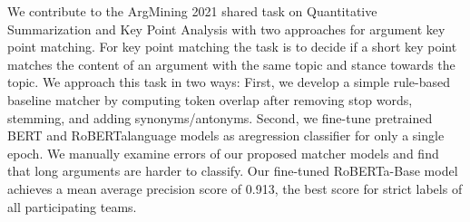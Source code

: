 We contribute to the ArgMining 2021 shared task on Quantitative Summarization and Key Point Analysis with two approaches for argument key point matching. For key point matching the task is to decide if a short key point matches the content of an argument with the same topic and stance towards the topic. We approach this task in two ways: First, we develop a simple rule-based baseline matcher by computing token overlap after removing stop words, stemming, and adding synonyms/antonyms. Second, we fine-tune pretrained BERT and RoBERTalanguage models as aregression classifier for only a single epoch. We manually examine errors of our proposed matcher models and find that long arguments are harder to classify. Our fine-tuned RoBERTa-Base model achieves a mean average precision score of 0.913, the best score for strict labels of all participating teams.
